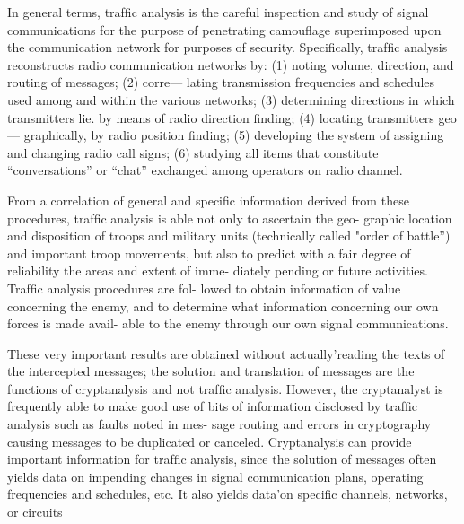 \mypara In general terms, trafﬁc analysis is the careful inspection and study
of signal communications for the purpose of penetrating camouﬂage
superimposed upon the communication network for purposes of security.
Speciﬁcally, trafﬁc analysis reconstructs radio communication networks
by: (1) noting volume, direction, and routing of messages; (2) corre—
lating transmission frequencies and schedules used among and within the
various networks; (3) determining directions in which transmitters lie.
by means of radio direction ﬁnding; (4) locating transmitters geo—
graphically, by radio position ﬁnding; (5) developing the system of
assigning and changing radio call signs; (6) studying all items that
constitute “conversations” or “chat” exchanged among operators on
radio channel.

\mypara From a correlation of general and speciﬁc information derived from
these procedures, trafﬁc analysis is able not only to ascertain the geo-
graphic location and disposition of troops and military units (technically
called "order of battle”) and important troop movements, but also to
predict with a fair degree of reliability the areas and extent of imme-
diately pending or future activities. Trafﬁc analysis procedures are fol-
lowed to obtain information of value concerning the enemy, and to
determine what information concerning our own forces is made avail-
able to the enemy through our own signal communications.

\mypara These very important results are obtained without actually'reading
the texts of the intercepted messages; the solution and translation of
messages are the functions of cryptanalysis and not trafﬁc analysis.
However, the cryptanalyst is frequently able to make good use of bits
of information disclosed by trafﬁc analysis such as faults noted in mes-
sage routing and errors in cryptography causing messages to be duplicated
or canceled. Cryptanalysis can provide important information for trafﬁc
analysis, since the solution of messages often yields data on impending
changes in signal communication plans, operating frequencies and schedules, etc. It also yields data'on speciﬁc channels, networks, or circuits

